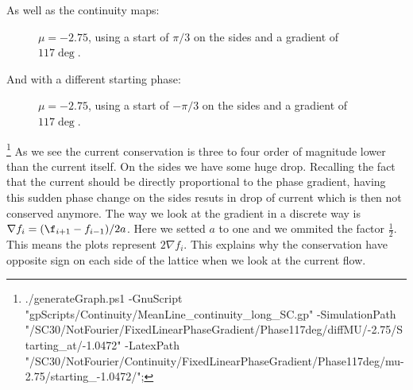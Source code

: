 \documentclass[../main.tex]{subfiles}
\begin{document}
As well as the continuity maps:
\begin{figure}[H]
    \centering
    
    \caption{$\mu = -2.75$, using a start of $\pi/3$ on the sides and a gradient of $117\si{\deg}$.}
\end{figure}
And  with a different starting phase:
\begin{figure}[H]
    \centering
    
    \caption{$\mu = -2.75$, using a start of $-\pi/3$ on the sides and a gradient of $117\si{\deg}$.}
\end{figure}
\footnote{./generateGraph.ps1 -GnuScript "gpScripts/Continuity/MeanLine\_continuity\_long\_SC.gp" -SimulationPath "/SC30/NotFourier/FixedLinearPhaseGradient/Phase117deg/diffMU/-2.75/Starting\_at/-1.0472" -LatexPath "/SC30/NotFourier/Continuity/FixedLinearPhaseGradient/Phase117deg/mu-2.75/starting\_-1.0472/";}
As we see the current conservation is three to four order of magnitude lower than the current itself. On the sides we have some huge drop. 
Recalling the fact that the current should be directly proportional to the phase gradient, having this sudden phase change 
on the sides resuts in drop of current which is then not conserved anymore. The way we look at the gradient in a discrete
way is $\nabla f_i = (\f_{i+1} - f_{i-1})/2a$. Here we setted $a$ to one and we ommited the factor $\frac{1}{2}$. This
means the plots represent $2\nabla f_i$. This explains why the conservation have opposite sign on each side of the lattice
when we look at the current flow.\\
%     

%     
\end{document}
